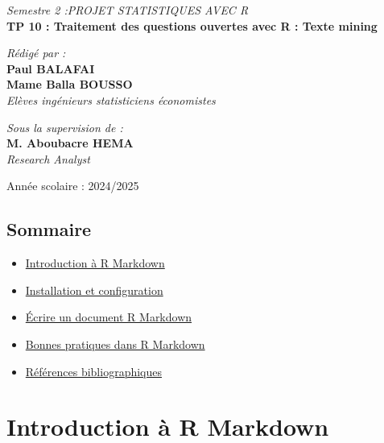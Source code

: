 \documentclass[
]{article}
\providecommand{\tightlist}{%
  \setlength{\itemsep}{0pt}\setlength{\parskip}{0pt}}
\begin{document}
\begin{titlepage}
\begin{center}
        \textit{\LARGE Semestre 2 :PROJET STATISTIQUES AVEC R }\\[0.3cm]
        \textbf{\Huge \color{green} \textsf{TP 10 : Traitement des questions ouvertes avec R : Texte mining}}\\[0.2cm]
        
        \begin{minipage}{0.5\textwidth}
    \begin{flushleft} \large
        \emph{\textsf{Rédigé par :}}\\
        \textbf{Paul BALAFAI}\\
        \textbf{Mame Balla BOUSSO}\\
        \textit{Elèves ingénieurs statisticiens économistes}
    \end{flushleft}
\end{minipage}
        \hfill
        \begin{minipage}{0.4\textwidth}
            \begin{flushright} \large
                \emph{\textsf{Sous la supervision de :}} \\
                \textbf{M. Aboubacre HEMA}\\
                \textit{Research Analyst }
            \end{flushright}
        \end{minipage}

        \vfill 

        {\large \textsf{Année scolaire : 2024/2025}}\\[0.5cm]
        
    \end{center}
\end{titlepage}

\subsection{Sommaire}\label{sommaire}

\begin{itemize}
\tightlist
\item
  \hyperref[introduction-uxe0-r-markdown]{Introduction à R Markdown}
\item
  \hyperref[1-installation-et-configuration-de-rmarkdown]{Installation
  et configuration}
\item
  \hyperref[2-uxe9crire-un-document-r-markdown]{Écrire un document R
  Markdown}
\item
  \hyperref[3-Bonnes-pratiques-dans-R-Markdown]{Bonnes pratiques dans R
  Markdown}
\item
  \hyperref[ruxe9fuxe9rences-bibliographiques]{Références
  bibliographiques}
\end{itemize}

\newpage

\section{Introduction à R Markdown}\label{introduction-uxe0-r-markdown}
\end{document}
